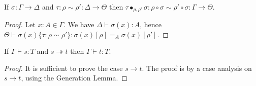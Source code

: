 {\begin{code}
\>  \AgdaSymbol{:}  \AgdaSymbol{\{}\AgdaSymbol{\}} \AgdaSymbol{\{} \AgdaSymbol{:}  \AgdaSymbol{\}} \AgdaSymbol{\{}     \AgdaSymbol{\}}  \<[56]%
\>[56]\<%
\\
\>[0]\<[18]%
\>[18]     \AgdaSymbol{(}  \AgdaSymbol{)}               \AgdaFunction{⋆[}      \AgdaFunction{]}          \<%
\end{code}
}

\begin{lemma}
\label{lm:pathsubcomp}
If $\sigma : \Gamma \rightarrow \Delta$ and $\tau : \rho \sim \rho' : \Delta \rightarrow \Theta$ then $\tau \bullet_{\rho, \rho'} \sigma : \rho \circ \sigma \sim \rho' \circ \sigma : \Gamma \rightarrow \Theta$.
\end{lemma}

\begin{proof}
Let $x : A \in \Gamma$.
We have $\Delta \vdash \sigma(x) : A$, hence $\Theta \vdash \sigma(x) \{ \tau : \rho \sim \rho' \} : \sigma(x) [ \rho ] =_A \sigma(x) [ \rho' ]$.
\end{proof}

\begin{prop}
If $\Gamma \vdash s : T$ and $s \twoheadrightarrow t$ then $\Gamma \vdash t : T$.
\end{prop}

\begin{proof}
It is sufficient to prove the case $s \rightarrow t$.  The proof is by a case analysis on $s \rightarrow t$, using the Generation Lemma.
\end{proof}

